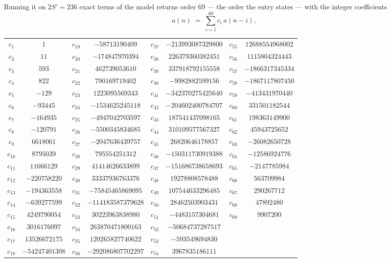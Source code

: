 \documentclass[11pt,a4paper]{article}
\theoremstyle{plain}
\theoremstyle{definition}
\begin{document}
Running it on $2S'=236$ exact terms of the model returns order $69$ --- the order the
entry states --- with the integer coefficients
\[
a(n)\;=\;\sum_{i=1}^{69}c_i\,a(n-i),
\]
\begin{center}\small
\begin{tabular}{cccccccc}
$c_{1}$ & $1$ & $c_{19}$ & $-58713190409$ & $c_{37}$ & $-213993087329800$ & $c_{55}$ & $12688554968002$ \\
$c_{2}$ & $11$ & $c_{20}$ & $-174847970394$ & $c_{38}$ & $226379360382451$ & $c_{56}$ & $1115804324443$ \\
$c_{3}$ & $593$ & $c_{21}$ & $462739053610$ & $c_{39}$ & $337918792155558$ & $c_{57}$ & $-1866317345334$ \\
$c_{4}$ & $822$ & $c_{22}$ & $790169719402$ & $c_{40}$ & $-9982882599156$ & $c_{58}$ & $-1867117807450$ \\
$c_{5}$ & $-129$ & $c_{23}$ & $1223095569343$ & $c_{41}$ & $-342370275425640$ & $c_{59}$ & $-413431970440$ \\
$c_{6}$ & $-93445$ & $c_{24}$ & $-1534625245118$ & $c_{42}$ & $-204602400784707$ & $c_{60}$ & $331501182544$ \\
$c_{7}$ & $-164935$ & $c_{25}$ & $-4947042703597$ & $c_{43}$ & $187541437098165$ & $c_{61}$ & $198363149900$ \\
$c_{8}$ & $-120791$ & $c_{26}$ & $-5500345834685$ & $c_{44}$ & $310109577567327$ & $c_{62}$ & $45943725652$ \\
$c_{9}$ & $6618061$ & $c_{27}$ & $-2047636439757$ & $c_{45}$ & $26820646178857$ & $c_{63}$ & $-26082650728$ \\
$c_{10}$ & $8795039$ & $c_{28}$ & $795554251312$ & $c_{46}$ & $-150311730919388$ & $c_{64}$ & $-12586924776$ \\
$c_{11}$ & $11666129$ & $c_{29}$ & $41414626633899$ & $c_{47}$ & $-151686738658693$ & $c_{65}$ & $-2147785984$ \\
$c_{12}$ & $-220758220$ & $c_{30}$ & $33337936763376$ & $c_{48}$ & $19278808578488$ & $c_{66}$ & $563709984$ \\
$c_{13}$ & $-194363558$ & $c_{31}$ & $-75845465869095$ & $c_{49}$ & $107544633296485$ & $c_{67}$ & $290267712$ \\
$c_{14}$ & $-639277599$ & $c_{32}$ & $-114183587379628$ & $c_{50}$ & $28462503903431$ & $c_{68}$ & $47892480$ \\
$c_{15}$ & $4249790054$ & $c_{33}$ & $30223963838980$ & $c_{51}$ & $-4483157304681$ & $c_{69}$ & $9907200$ \\
$c_{16}$ & $3016176097$ & $c_{34}$ & $263870471800163$ & $c_{52}$ & $-50684737287517$ &  &  \\
$c_{17}$ & $13526672175$ & $c_{35}$ & $120265827740622$ & $c_{53}$ & $-593549694830$ &  &  \\
$c_{18}$ & $-54247401308$ & $c_{36}$ & $-292086807702297$ & $c_{54}$ & $3967835186111$ &  &  \\
\end{tabular}
\end{center}
\end{document}
